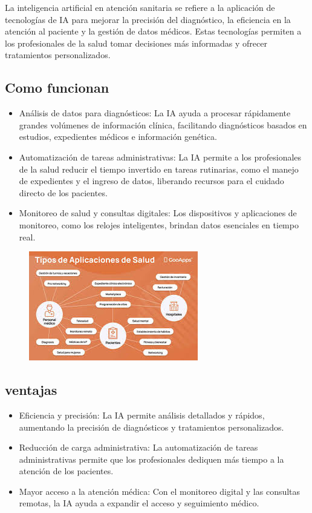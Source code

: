 \documentclass[12pt]{article}
\begin{document}
La inteligencia artificial en atención sanitaria se refiere a la aplicación de tecnologías de IA para mejorar la precisión
del diagnóstico, la eficiencia en la atención al paciente y la gestión de datos médicos. Estas tecnologías permiten a los
profesionales de la salud tomar decisiones más informadas y ofrecer tratamientos personalizados.

\subsection{Como funcionan}

\begin{itemize}
    \item Análisis de datos para diagnósticos: 
    La IA ayuda a procesar rápidamente grandes volúmenes de información clínica, facilitando diagnósticos basados en
    estudios, expedientes médicos e información genética.
    \item Automatización de tareas administrativas: 
    La IA permite a los profesionales de la salud reducir el tiempo invertido en tareas rutinarias, como el manejo de
    expedientes y el ingreso de datos, liberando recursos para el cuidado directo de los pacientes.
    \item Monitoreo de salud y consultas digitales: 
    Los dispositivos y aplicaciones de monitoreo, como los relojes inteligentes, brindan datos esenciales en tiempo real. 
\end{itemize}

\begin{figure}[h!]
    \centering
    \includegraphics[width=.6\textwidth]{sanitaria.png}
    \label{fig:my_label}
\end{figure}

\subsection{ventajas}

\begin{itemize}
    \item Eficiencia y precisión: 
    La IA permite análisis detallados y rápidos, aumentando la precisión de diagnósticos y tratamientos personalizados.
    \item Reducción de carga administrativa: 
    La automatización de tareas administrativas permite que los profesionales dediquen más tiempo a la atención de los pacientes.
    \item Mayor acceso a la atención médica: 
    Con el monitoreo digital y las consultas remotas, la IA ayuda a expandir el acceso y seguimiento médico.    
\end{itemize}
\end{document}
